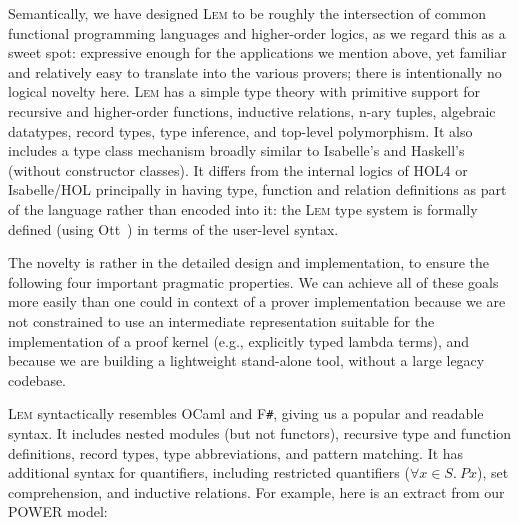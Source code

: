 \documentclass[a4paper]{llncs}
\newcommand{\myparagraph}[1]{\vspace{0.5\baselineskip}\par\noindent{\normalsize\bfseries{#1}}\quad}
\newcommand{\toolname}{\textsc{Lem}}
\begin{document}
Semantically, we have designed \toolname{} to be 
roughly the intersection of
common functional programming languages and higher-order logics,
as we regard this as a sweet spot: expressive enough for the
applications we mention above, yet familiar and relatively easy to translate 
into the various provers; there is intentionally no logical novelty here. 
%
\toolname{} 
has a simple
type theory %
with primitive support for recursive and
higher-order functions, inductive relations, n-ary tuples, algebraic
datatypes, record types, type inference, and top-level polymorphism.  
It also includes a type class mechanism
broadly similar to Isabelle's and Haskell's %
(without
constructor classes).  It differs from the internal logics of HOL4 or
Isabelle/HOL principally in having type, function and relation
definitions as part of the language rather than encoded into it:
the \toolname{} type system is formally defined (using Ott~\cite{ott}) in terms of
the user-level syntax. 


The novelty is rather in the detailed design and implementation,
to ensure the following four important pragmatic properties. 
We can achieve all of these
goals more easily than one could in context of a  prover implementation because we are not constrained to
use an intermediate representation suitable for the implementation of a
proof kernel (e.g., explicitly typed lambda terms), and because we
are building a lightweight stand-alone tool, without a large legacy codebase.



\myparagraph{1. Readability of source files}
\toolname{} syntactically resembles OCaml and F\texttt{\#}, %
giving us a popular and readable syntax.
It includes nested modules (but not functors), 
recursive type and function definitions, record types, type abbreviations, and
pattern matching.
  It has additional
syntax for quantifiers, including restricted quantifiers ($\forall x \in S.\ P x$),
set comprehension, and inductive relations.
For example, here is an extract from our POWER model:
\end{document}
